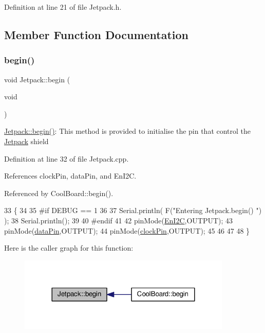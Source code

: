 Definition at line 21 of file Jetpack.\+h.



\subsection{Member Function Documentation}
\mbox{\label{classJetpack_a5a53e1ebf7aaf3bf3e0d37ea64ca09a7}} 
\subsubsection{\texorpdfstring{begin()}{begin()}}
{\footnotesize\ttfamily void Jetpack\+::begin (\begin{DoxyParamCaption}\item[{void}]{ }\end{DoxyParamCaption})}

\hyperlink{classJetpack_a5a53e1ebf7aaf3bf3e0d37ea64ca09a7}{Jetpack\+::begin()}\+: This method is provided to initialise the pin that control the \hyperlink{classJetpack}{Jetpack} shield 

Definition at line 32 of file Jetpack.\+cpp.



References clock\+Pin, data\+Pin, and En\+I2C.



Referenced by Cool\+Board\+::begin().


\begin{DoxyCode}
33 \{
34 
35 \textcolor{preprocessor}{#if DEBUG == 1 }
36  
37     Serial.println( F(\textcolor{stringliteral}{"Entering Jetpack.begin() "}) );
38     Serial.println();
39 
40 \textcolor{preprocessor}{#endif}
41 
42     pinMode(\hyperlink{classJetpack_a81df984fb4cea98c71aa1a1cfcdfe814}{EnI2C},OUTPUT);
43     pinMode(\hyperlink{classJetpack_a3d669a56e93c71dd25f970d4ed7d0c00}{dataPin},OUTPUT);
44     pinMode(\hyperlink{classJetpack_a58ebb991f358f3ae94e82148b0221b5a}{clockPin},OUTPUT);
45     
46     
47 
48 \}
\end{DoxyCode}
Here is the caller graph for this function\+:\nopagebreak
\begin{figure}[H]
\begin{center}
\leavevmode
\includegraphics[width=288pt]{classJetpack_a5a53e1ebf7aaf3bf3e0d37ea64ca09a7_icgraph}
\end{center}
\end{figure}
\mbox{\label{classJetpack_ab065ee83e244265a2223a22f3ee4a719}} 

